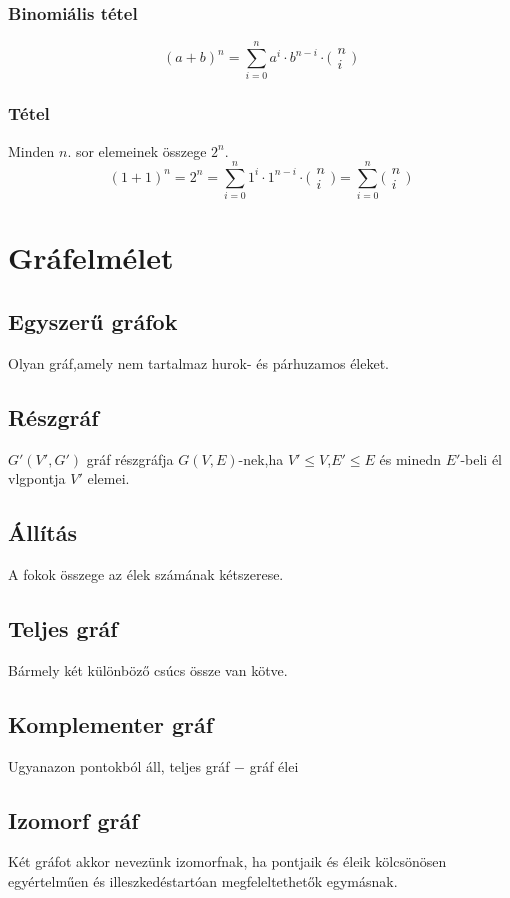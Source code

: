 \documentclass[12pt,a4paper,twoside]{report}
\begin{document}
\subsubsection{Binomiális tétel}
$$(a+b)^n=\sum_{i=0}^{n}a^i\cdot b^{n-i}\cdot\bigl( \begin{smallmatrix*}n\\i\end{smallmatrix*}\bigl)$$
\subsubsection{Tétel}
Minden $n$. sor elemeinek összege $2^n$.
\biz
$$(1+1)^n=2^n=\sum_{i=0}^{n}1^i\cdot 1^{n-i}\cdot\bigl( \begin{smallmatrix*}n\\i\end{smallmatrix*}\bigl)=\sum_{i=0}^{n}\bigl( \begin{smallmatrix*}n\\i\end{smallmatrix*}\bigl)$$
\section{Gráfelmélet}
\subsection{Egyszerű gráfok}
Olyan gráf,amely nem tartalmaz hurok- és párhuzamos éleket.
\subsection{Részgráf}
$G'(V',G')$ gráf részgráfja $G(V,E)$-nek,ha $V'\leq V$,$E'\leq E$ és minedn $E'$-beli él vlgpontja $V'$ elemei.
\subsection{Állítás}
A fokok összege az élek számának kétszerese.
\subsection{Teljes gráf}
Bármely két különböző csúcs össze van kötve.
\subsection{Komplementer gráf}
Ugyanazon pontokból áll, teljes gráf $-$ gráf élei
\subsection{Izomorf gráf}
Két gráfot akkor nevezünk izomorfnak, ha pontjaik és éleik kölcsönösen egyértelműen és illeszkedéstartóan megfeleltethetők egymásnak.
\end{document}
